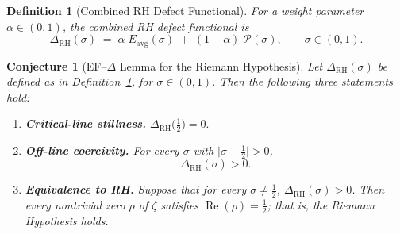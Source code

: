 \documentclass[11pt]{article}
\newtheorem{definition}[theorem]{Definition}
\newtheorem{conjecture}[theorem]{Conjecture}
\theoremstyle{remark}
\DeclareMathOperator{\Rea}{Re}
\begin{document}

\begin{definition}[Combined RH Defect Functional]
\label{def:delta-rh}
For a weight parameter $\alpha\in(0,1)$, the
\emph{combined RH defect functional} is
\[
  \boxed{\;
  \Delta_{\mathrm{RH}}(\sigma)
  \;=\;
  \alpha\; E_{\mathrm{avg}}(\sigma)
  \;+\;
  (1-\alpha)\;\mathcal{P}(\sigma),
  \qquad \sigma\in(0,1).
  \;}
\]
\end{definition}


\begin{conjecture}[EF--$\Delta$ Lemma for the Riemann Hypothesis]
\label{conj:ef-delta}
Let\/ $\Delta_{\mathrm{RH}}(\sigma)$ be defined as in
Definition~\ref{def:delta-rh}, for $\sigma\in(0,1)$.
Then the following three statements hold:
\begin{enumerate}
\item[\textbf{(1)}]
  \textbf{Critical-line stillness.}\;
  $\Delta_{\mathrm{RH}}\!\bigl(\tfrac{1}{2}\bigr) = 0.$

\item[\textbf{(2)}]
  \textbf{Off-line coercivity.}\;
  For every $\sigma$ with
  $\lvert\sigma - \tfrac{1}{2}\rvert > 0$,
  \[
    \Delta_{\mathrm{RH}}(\sigma) > 0.
  \]

\item[\textbf{(3)}]
  \textbf{Equivalence to RH.}\;
  Suppose that for every $\sigma\neq\tfrac{1}{2}$,
  $\Delta_{\mathrm{RH}}(\sigma)>0$.
  Then every nontrivial zero $\rho$ of $\zeta$ satisfies
  $\Rea(\rho)=\tfrac{1}{2}$; that is, the Riemann Hypothesis holds.
\end{enumerate}
\end{conjecture}

\end{document}

